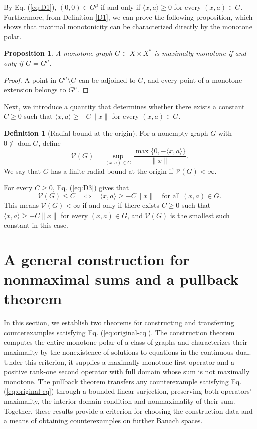 \documentclass[11pt]{article}
\newcommand{\dom}{\operatorname{dom}}
\newcommand{\pair}[2]{\langle #1,#2\rangle}
\newtheorem{proposition}{Proposition}
\theoremstyle{definition}
\newtheorem{definition}{Definition}
\theoremstyle{remark}
\begin{document}
By Eq. (\ref{eq:D1}), $(0,0)\in G^\mu$ if and only if $\pair{x}{a}\ge0$ for every $(x,a)\in G$. Furthermore, from Definition \ref{D1}, we can prove the following proposition, which shows that maximal monotonicity can be characterized directly by the monotone polar. 


\begin{proposition}
A monotone graph $G\subset X\times X^*$ is maximally monotone if and only if $G=G^\mu$.
\end{proposition}
\begin{proof}
A point in $G^\mu\setminus G$ can be adjoined to $G$, and every point of a monotone extension belongs to $G^\mu$.
\end{proof}


Next, we introduce a quantity that determines whether there exists a constant $C\ge0$ such that $\pair{x}{a}\ge-C\|x\|$ for every $(x,a)\in G$. 

\begin{definition}[Radial bound at the origin]
\label{def:radial-bound}
For a nonempty graph $G$ with $0\notin\dom G$, define
\begin{equation}
\mathcal V(G)=\sup_{(x,a)\in G}
 \frac{\max\{0,-\pair{x}{a}\}}{\|x\|}.
\label{eq:D3}
\end{equation}
We say that $G$ has a finite radial bound at the origin if $\mathcal V(G)<\infty$.
\end{definition}
For every $C\ge0$, Eq. (\ref{eq:D3}) gives that 
\[
\mathcal V(G)\le C
\quad\Longleftrightarrow\quad
\pair{x}{a}\ge-C\|x\|
\quad\text{for all }(x,a)\in G.
\]
This means $\mathcal V(G)<\infty$ if and only if there exists $C\ge0$ such that $\pair{x}{a}\ge-C\|x\|$ for every $(x,a)\in G$, and $\mathcal V(G)$ is the smallest such constant in this case. 





\section{A general construction for nonmaximal sums and a pullback theorem}
\label{sec:endpoint-criterion}

In this section, we establish two theorems for constructing and transferring counterexamples satisfying Eq. (\ref{eq:original-cq}). The construction theorem computes the entire monotone polar of a class of graphs and characterizes their maximality by the nonexistence of solutions to equations in the continuous dual. Under this criterion, it supplies a maximally monotone first operator and a positive rank-one second operator with full domain whose sum is not maximally monotone. The pullback theorem transfers any counterexample satisfying Eq. (\ref{eq:original-cq}) through a bounded linear surjection, preserving both operators' maximality, the interior-domain condition and nonmaximality of their sum. Together, these results provide a criterion for choosing the construction data and a means of obtaining counterexamples on further Banach spaces.
\end{document}
